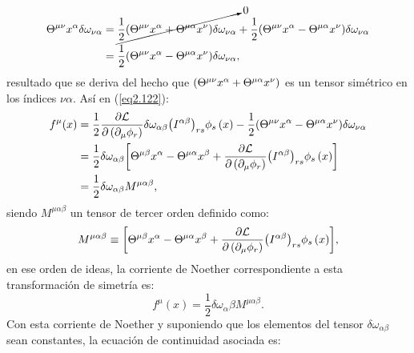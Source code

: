 \begin{equation}
    \begin{split}
        \Theta ^{\mu \nu }x^{\alpha }\delta \omega _{\nu \alpha } &= \cancelto{0}{
        \frac{1}{2} \qty(\Theta ^{\mu \nu }x^{\alpha }+\Theta ^{\mu \alpha }x^{\nu })\delta \omega_{\nu \alpha }}+\frac{1}{2} \qty(\Theta ^{\mu \nu }x^{\alpha }-\Theta ^{\mu \alpha}x^{\nu })\delta \omega _{\nu \alpha } \\
        &= \frac{1}{2}(\Theta ^{\mu \nu }x^{\alpha }-\Theta ^{\mu \alpha }x^{\nu})\delta \omega _{\nu \alpha },
    \end{split}
\end{equation}
resultado que se deriva del hecho que $\qty(\Theta ^{\mu \nu }x^{\alpha }+\Theta ^{\mu \alpha }x^{\nu })$ es un tensor simétrico en los índices $\nu \alpha$. Así en (\ref{eq2.122}):
\begin{equation*}
    \begin{split}
        f^{\mu }(x) &= \frac{1}{2}\frac{\partial \mathcal{L}}{\partial \left( \partial _{\mu }\phi _{r}\right) }\delta \omega _{\alpha \beta } \qty(I^{\alpha \beta })_{rs}\phi _{s}\left( x\right) -\frac{1}{2} \qty(\Theta ^{\mu \nu }x^{\alpha }-\Theta ^{\mu \alpha }x^{\nu })\delta \omega _{\nu \alpha } \\
        &= \frac{1}{2}\delta \omega _{\alpha \beta } \qty[\Theta ^{\mu \beta }x^{\alpha }-\Theta ^{\mu \alpha }x^{\beta}+\frac{\partial \mathcal{L}}{\partial \left( \partial _{\mu }\phi _{r}\right) } \qty(I^{\alpha \beta })_{rs}\phi_{s}\left( x\right) ] \\
        &= \frac{1}{2}\delta \omega _{\alpha \beta }M^{\mu \alpha \beta },
    \end{split}
\end{equation*}
siendo $M^{\mu \alpha \beta}$ un tensor de tercer orden definido como:
\begin{equation}
    M^{\mu \alpha \beta }\equiv \qty[\Theta ^{\mu \beta }x^{\alpha }-\Theta ^{\mu \alpha }x^{\beta}+\frac{\partial \mathcal{L}}{\partial \left( \partial _{\mu }\phi _{r}\right) } \qty(I^{\alpha \beta })_{rs}\phi_{s}\left( x\right)],
    \label{TenM}
\end{equation}
en ese orden de ideas, la corriente de Noether correspondiente a esta transformación de simetría es:
\begin{equation}
    f^{\mu}(x)=\frac{1}{2}\delta \omega_{\alpha}{\beta}M^{\mu \alpha \beta}.
    \label{corrM}
\end{equation}
Con esta corriente de Noether y suponiendo que los elementos del tensor $\delta \omega_{\alpha \beta}$ sean constantes, la ecuación de continuidad asociada es:
